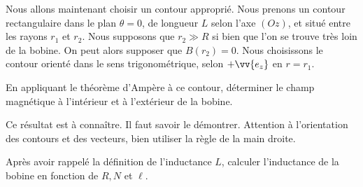 \documentclass[11pt,fleqn]{book} %
\newcommand{\dd}{\mathrm{d}}
\begin{document}
Nous allons maintenant choisir un contour approprié. Nous prenons un contour rectangulaire dans le plan $\theta=0$, de longueur $L$ selon l'axe $(Oz)$, et situé entre les rayons $r_1$ et $r_2$. Nous supposons que $r_2 \gg R$ si bien que l'on se trouve très loin de la bobine. On peut alors supposer que $B(r_2) = 0$. Nous choisissons le contour orienté dans le sens trigonométrique, selon $+\vv{e_z}$ en $r=r_1$. 

\begin{capex}
En appliquant le théorème d'Ampère à ce contour, déterminer le champ magnétique à l'intérieur et à l'extérieur de la bobine.
\end{capex}


\begin{remark}
    Ce résultat est à connaître. Il faut savoir le démontrer. Attention à l'orientation des contours et des vecteurs, bien utiliser la règle de la main droite.
\end{remark}

\begin{capex}
Après avoir rappelé la définition de l'inductance $L$, calculer l'inductance de la bobine en fonction de $R,N$ et $\ell$.
\end{capex}
\end{document}
